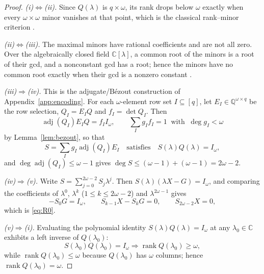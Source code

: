 \documentclass[journal]{IEEEtran}
\theoremstyle{plainn}
\theoremstyle{remark}
\begin{document}
\begin{proof}
\emph{(i)$\Leftrightarrow$(ii).} Since $Q(\lambda)$ is $q\times\omega$, its rank drops below
$\omega$ exactly when every $\omega\times\omega$ minor vanishes at that point, which is the
classical rank--minor criterion \cite[Ch.~0]{hj13}.

\emph{(ii)$\Leftrightarrow$(iii).} The maximal minors have rational coefficients and are not all
zero. Over the algebraically closed field $\mathbb C[\lambda]$, a common root of the minors is a
root of their gcd, and a nonconstant gcd has a root; hence the minors have no common root exactly
when their gcd is a nonzero constant \cite[Ch.~IV]{lan02}.

\emph{(iii)$\Rightarrow$(iv).} This is the adjugate/B\'ezout construction of
Appendix~\ref{app:encoding}. For each $\omega$-element row set
$I\subseteq[q]$, let $E_I\in\mathbb Q^{\omega\times q}$ be the row selection,
$Q_I=E_IQ$ and $f_I=\det Q_I$. Then
\begin{equation*}
\operatorname{adj}(Q_I)E_IQ=f_II_\omega,\qquad
\sum_Ig_If_I=1\ \text{ with }\ \deg g_I<\omega
\end{equation*}
by Lemma~\ref{lem:bezout}, so that
\begin{equation*}
S=\sum_Ig_I\operatorname{adj}(Q_I)E_I
\quad\text{satisfies}\quad
S(\lambda)Q(\lambda)=I_\omega ,
\end{equation*}
and $\deg\operatorname{adj}(Q_I)\le\omega-1$ gives
$\deg S\le(\omega-1)+(\omega-1)=2\omega-2$.

\emph{(iv)$\Rightarrow$(v).} Write $S=\sum_{j=0}^{2\omega-2}S_j\lambda^j$. Then
$S(\lambda)(\lambda X-G)=I_\omega$, and comparing the coefficients of
$\lambda^0$, $\lambda^k$ ($1\le k\le2\omega-2$) and $\lambda^{2\omega-1}$ gives
\begin{equation*}
-S_0G=I_\omega,\qquad S_{k-1}X-S_kG=0,\qquad S_{2\omega-2}X=0,
\end{equation*}
which is \eqref{eq:R0}.

\emph{(v)$\Rightarrow$(i).} Evaluating the polynomial identity
$S(\lambda)Q(\lambda)=I_\omega$ at any $\lambda_0\in\mathbb C$ exhibits a left
inverse of $Q(\lambda_0)$:
\begin{equation*}
S(\lambda_0)Q(\lambda_0)=I_\omega
\Longrightarrow\operatorname{rank}Q(\lambda_0)\ge\omega,
\end{equation*}
while $\operatorname{rank}Q(\lambda_0)\le\omega$ because $Q(\lambda_0)$ has
$\omega$ columns; hence $\operatorname{rank}Q(\lambda_0)=\omega$.
\end{proof}
\end{document}
